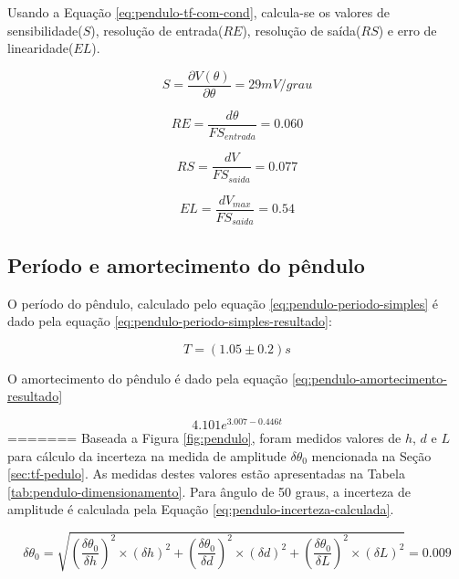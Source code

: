 \documentclass[a4paper]{instrumentacao}
\begin{document}
Usando a Equação \ref{eq:pendulo-tf-com-cond}, calcula-se os valores de sensibilidade($S$), resolução de entrada($RE$), resolução de saída($RS$) e erro de linearidade($EL$).

\begin{equation}
	S = \dfrac{\partial V(\theta)}{\partial \theta} = 29mV/grau
	\label{eq:sensibilidade-com-cond}
\end{equation}

\begin{equation}
	RE = \dfrac{d\theta}{FS_{entrada}} = 0.060
	\label{eq:resolucao-entrada-com-cond}
\end{equation}

\begin{equation}
	RS = \dfrac{dV}{FS_{saida}} = 0.077
	\label{eq:resolucao-saida-com-cond}
\end{equation}

\begin{equation}
	EL = \dfrac{dV_{max}}{FS_{saida}} = 0.54
	\label{eq:resolucao-saida-com-cond}
\end{equation}

\subsection{Período e amortecimento do pêndulo}
O período do pêndulo, calculado pelo equação \ref{eq:pendulo-periodo-simples} é dado pela equação \ref{eq:pendulo-periodo-simples-resultado}:

\begin{equation}
	T = (1.05 \pm 0.2) s
	\label{eq:pendulo-periodo-simples-resultado}
\end{equation}

O amortecimento do pêndulo é dado pela equação \ref{eq:pendulo-amortecimento-resultado}

\begin{equation}
	4.101 e^{3.007 - 0.446 t}
	\label{eq:pendulo-amortecimento-resultado}
\end{equation}
=======
Baseada a Figura \ref{fig:pendulo}, foram medidos valores de $h$, $d$ e $L$ para cálculo da incerteza na medida de amplitude $\delta\theta_{0}$ mencionada na Seção \ref{sec:tf-pedulo}. As medidas destes valores estão apresentadas na Tabela \ref{tab:pendulo-dimensionamento}. Para ângulo de 50 graus, a incerteza de amplitude é calculada pela Equação \ref{eq:pendulo-incerteza-calculada}.

\begin{equation}
	\delta\theta_{0}= \sqrt{(\dfrac{\delta\theta_{0}}{\delta h})^2 \times (\delta h)^2 + (\dfrac{\delta\theta_{0}}{\delta d})^2 \times (\delta d)^2 + (\dfrac{\delta\theta_{0}}{\delta L})^2 \times (\delta L)^2} = 0.009
	\label{eq:pendulo-incerteza-calculada}
\end{equation}
\end{document}
